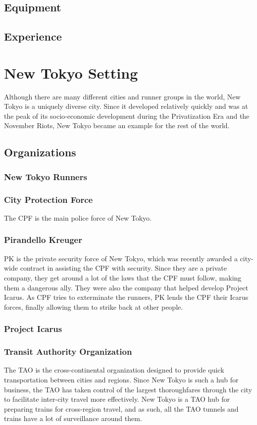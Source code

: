 \documentclass{article}
\begin{document}
\subsection{Equipment}
\subsection{Experience}
\section{New Tokyo Setting}
Although there are many different cities and runner groups in the world, New
Tokyo is a uniquely diverse city. Since it developed relatively quickly and was at the peak of its socio-economic development during the Privatization Era and the November Riots, New Tokyo became an example for the rest of the world.
\subsection{Organizations}
\subsubsection{New Tokyo Runners}
\subsubsection{City Protection Force}
The CPF is the main police force of New Tokyo.
\subsubsection{Pirandello Kreuger}
PK is the private security force of New Tokyo, which was recently awarded a
city-wide contract in assisting the CPF with security. Since they are a private company, they get around a lot of the laws that the CPF must follow, making them a dangerous ally. They were also the company that helped develop Project Icarus. As CPF tries to exterminate the runners, PK lends the CPF their Icarus forces, finally allowing them to strike back at other people.
\subsubsection{Project Icarus}
\subsubsection{Transit Authority Organization}
The TAO is the cross-continental organization designed to provide quick
transportation between cities and regions. Since New Tokyo is such a hub for business, the TAO has taken control of the largest thoroughfares through the city to facilitate inter-city travel more effectively. New Tokyo is a TAO hub for preparing trains for cross-region travel, and as such, all the TAO tunnels and trains have a lot of surveillance around them.
\end{document}
